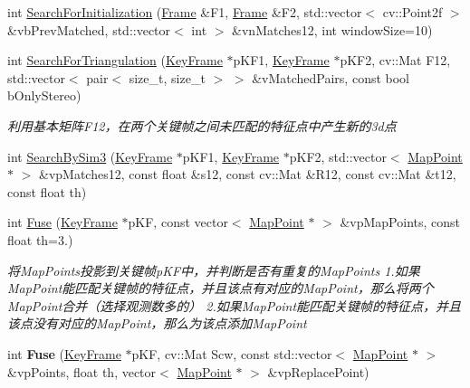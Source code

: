 \begin{DoxyCompactItemize}
\item 
int \hyperlink{classORB__SLAM2_1_1ORBmatcher_aff9b6dde7878d59e334ed5ad2ddd04eb}{Search\-For\-Initialization} (\hyperlink{classORB__SLAM2_1_1Frame}{Frame} \&F1, \hyperlink{classORB__SLAM2_1_1Frame}{Frame} \&F2, std\-::vector$<$ cv\-::\-Point2f $>$ \&vb\-Prev\-Matched, std\-::vector$<$ int $>$ \&vn\-Matches12, int window\-Size=10)
\item 
int \hyperlink{classORB__SLAM2_1_1ORBmatcher_a0ecb7f018e9184c67c4a48ad8616217d}{Search\-For\-Triangulation} (\hyperlink{classORB__SLAM2_1_1KeyFrame}{Key\-Frame} $\ast$p\-K\-F1, \hyperlink{classORB__SLAM2_1_1KeyFrame}{Key\-Frame} $\ast$p\-K\-F2, cv\-::\-Mat F12, std\-::vector$<$ pair$<$ size\-\_\-t, size\-\_\-t $>$ $>$ \&v\-Matched\-Pairs, const bool b\-Only\-Stereo)
\begin{DoxyCompactList}\small\item\em 利用基本矩阵\-F12，在两个关键帧之间未匹配的特征点中产生新的3d点 \end{DoxyCompactList}\item 
int \hyperlink{classORB__SLAM2_1_1ORBmatcher_aa8ab1e3785aad3fa26855a4efccfa565}{Search\-By\-Sim3} (\hyperlink{classORB__SLAM2_1_1KeyFrame}{Key\-Frame} $\ast$p\-K\-F1, \hyperlink{classORB__SLAM2_1_1KeyFrame}{Key\-Frame} $\ast$p\-K\-F2, std\-::vector$<$ \hyperlink{classORB__SLAM2_1_1MapPoint}{Map\-Point} $\ast$ $>$ \&vp\-Matches12, const float \&s12, const cv\-::\-Mat \&R12, const cv\-::\-Mat \&t12, const float th)
\item 
int \hyperlink{classORB__SLAM2_1_1ORBmatcher_a0b63d334ccbb34fc7dda0eed2b96320e}{Fuse} (\hyperlink{classORB__SLAM2_1_1KeyFrame}{Key\-Frame} $\ast$p\-K\-F, const vector$<$ \hyperlink{classORB__SLAM2_1_1MapPoint}{Map\-Point} $\ast$ $>$ \&vp\-Map\-Points, const float th=3.)
\begin{DoxyCompactList}\small\item\em 将\-Map\-Points投影到关键帧p\-K\-F中，并判断是否有重复的\-Map\-Points 1.如果\-Map\-Point能匹配关键帧的特征点，并且该点有对应的\-Map\-Point，那么将两个\-Map\-Point合并（选择观测数多的） 2.如果\-Map\-Point能匹配关键帧的特征点，并且该点没有对应的\-Map\-Point，那么为该点添加\-Map\-Point \end{DoxyCompactList}\item 
\hypertarget{classORB__SLAM2_1_1ORBmatcher_a3062482add2618408bc4c222f833781e}{int {\bfseries Fuse} (\hyperlink{classORB__SLAM2_1_1KeyFrame}{Key\-Frame} $\ast$p\-K\-F, cv\-::\-Mat Scw, const std\-::vector$<$ \hyperlink{classORB__SLAM2_1_1MapPoint}{Map\-Point} $\ast$ $>$ \&vp\-Points, float th, vector$<$ \hyperlink{classORB__SLAM2_1_1MapPoint}{Map\-Point} $\ast$ $>$ \&vp\-Replace\-Point)}\label{classORB__SLAM2_1_1ORBmatcher_a3062482add2618408bc4c222f833781e}

\end{DoxyCompactItemize}
